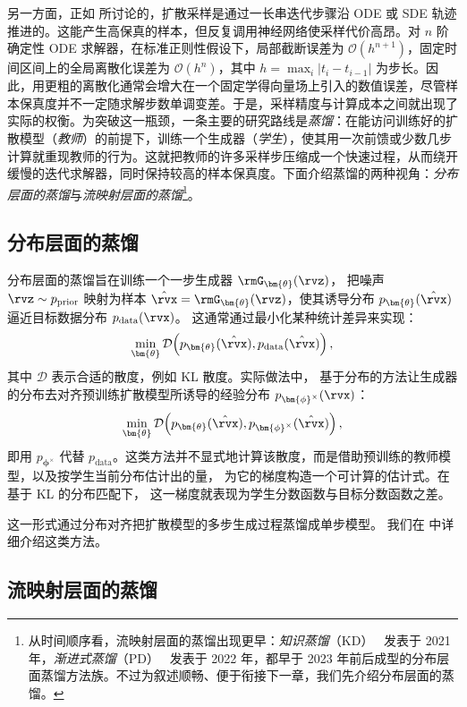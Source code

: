 另一方面，正如  所讨论的，扩散采样是通过一长串迭代步骤沿 ODE 或 SDE 轨迹推进的。这能产生高保真的样本，但反复调用神经网络使采样代价高昂。对 $n$ 阶确定性 ODE 求解器，在标准正则性假设下，局部截断误差为 $\mathcal{O}(h^{n+1})$，固定时间区间上的全局离散化误差为 $\mathcal{O}(h^n)$，其中 $h=\max_i |t_i-t_{i-1}|$ 为步长。因此，用更粗的离散化通常会增大在一个固定学得向量场上引入的数值误差，尽管样本保真度并不一定随求解步数单调变差。于是，采样精度与计算成本之间就出现了实际的权衡。为突破这一瓶颈，一条主要的研究路线是\emph{蒸馏}：在能访问训练好的扩散模型（\emph{教师}）的前提下，训练一个生成器（\emph{学生}），使其用一次前馈或少数几步计算就重现教师的行为。这就把教师的许多采样步压缩成一个快速过程，从而绕开缓慢的迭代求解器，同时保持较高的样本保真度。下面介绍蒸馏的两种视角：\emph{分布层面的蒸馏}与\emph{流映射层面的蒸馏}\footnote{从时间顺序看，流映射层面的蒸馏出现更早：\emph{知识蒸馏}（KD）~\citep{luhman2021knowledge} 发表于 2021 年，\emph{渐进式蒸馏}（PD）~\citep{salimans2021progressive} 发表于 2022 年，都早于 2023 年前后成型的分布层面蒸馏方法族。不过为叙述顺畅、便于衔接下一章，我们先介绍分布层面的蒸馏。}。


\subsection{分布层面的蒸馏}
分布层面的蒸馏旨在训练一个一步生成器 $\rmG_{\bm{\theta}}(\rvz)$，
把噪声 $\rvz \sim p_{\mathrm{prior}}$ 映射为样本
$\hat\rvx = \rmG_{\bm{\theta}}(\rvz)$，使其诱导分布
$p_{\bm{\theta}}(\hat\rvx)$ 逼近目标数据分布 $p_{\mathrm{data}}(\rvx)$。
这通常通过最小化某种统计差异来实现：
\[
\min_{\bm{\theta}}  \mathcal{D}\!\left(p_{\bm{\theta}}(\hat\rvx),  p_{\mathrm{data}}(\hat\rvx)\right),
\]
其中 $\mathcal{D}$ 表示合适的散度，例如 KL 散度。实际做法中，
基于分布的方法让生成器的分布去对齐预训练扩散模型所诱导的经验分布 $p_{\bm{\phi}^\times}(\rvx)$：
\[
\min_{\bm{\theta}}  \mathcal{D}\!\left(p_{\bm{\theta}}(\hat\rvx),  p_{\bm{\phi}^\times}(\hat\rvx)\right),
\]
即用 $p_{\bm{\phi}^\times}$ 代替 $p_{\mathrm{data}}$。这类方法并不显式地计算该散度，而是借助预训练的教师模型，以及按学生当前分布估计出的量，
为它的梯度构造一个可计算的估计式。在基于 KL 的分布匹配下，
这一梯度就表现为学生分数函数与目标分数函数之差。

这一形式通过分布对齐把扩散模型的多步生成过程蒸馏成单步模型。
我们在  中详细介绍这类方法。


\subsection{流映射层面的蒸馏}

